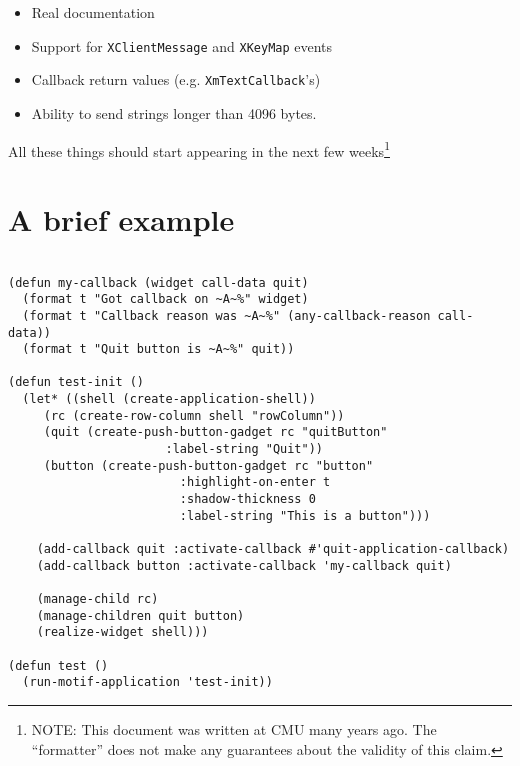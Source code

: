 \documentclass{article}
\begin{document}
\begin{itemize}
\item Real documentation
\item Support for \texttt{XClientMessage} and \texttt{XKeyMap} events
\item Callback return values (e.g. \texttt{XmTextCallback}'s)
\item Ability to send strings longer than 4096 bytes.
\end{itemize}

All these things should start appearing in the next few
weeks\footnote{NOTE: This document was written at CMU many years ago.
The ``formatter'' does not make any guarantees about the validity of
this claim.}


\section{A brief example}

\begin{verbatim}

(defun my-callback (widget call-data quit)
  (format t "Got callback on ~A~%" widget)
  (format t "Callback reason was ~A~%" (any-callback-reason call-data))
  (format t "Quit button is ~A~%" quit))

(defun test-init ()
  (let* ((shell (create-application-shell))
	 (rc (create-row-column shell "rowColumn"))
	 (quit (create-push-button-gadget rc "quitButton"
					  :label-string "Quit"))
	 (button (create-push-button-gadget rc "button"
					    :highlight-on-enter t
					    :shadow-thickness 0
					    :label-string "This is a button")))

    (add-callback quit :activate-callback #'quit-application-callback)
    (add-callback button :activate-callback 'my-callback quit)

    (manage-child rc)
    (manage-children quit button)
    (realize-widget shell)))

(defun test ()
  (run-motif-application 'test-init))
\end{verbatim}
\end{document}
